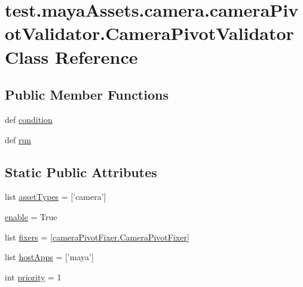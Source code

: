 \hypertarget{classtest_1_1mayaAssets_1_1camera_1_1cameraPivotValidator_1_1CameraPivotValidator}{\section{test.\-maya\-Assets.\-camera.\-camera\-Pivot\-Validator.\-Camera\-Pivot\-Validator \-Class \-Reference}
\label{d7/d71/classtest_1_1mayaAssets_1_1camera_1_1cameraPivotValidator_1_1CameraPivotValidator}
}
\subsection*{\-Public \-Member \-Functions}
\begin{DoxyCompactItemize}
\item 
def \hyperlink{classtest_1_1mayaAssets_1_1camera_1_1cameraPivotValidator_1_1CameraPivotValidator_a976f03c3834da1ca30215212a06a969a}{condition}
\item 
def \hyperlink{classtest_1_1mayaAssets_1_1camera_1_1cameraPivotValidator_1_1CameraPivotValidator_ab7a54b126d4a4a91c533b9d4199dd4e9}{run}
\end{DoxyCompactItemize}
\subsection*{\-Static \-Public \-Attributes}
\begin{DoxyCompactItemize}
\item 
list \hyperlink{classtest_1_1mayaAssets_1_1camera_1_1cameraPivotValidator_1_1CameraPivotValidator_abbea9f5217bd6142503740bab1ddb602}{asset\-Types} = \mbox{[}'camera'\mbox{]}
\item 
\hyperlink{classtest_1_1mayaAssets_1_1camera_1_1cameraPivotValidator_1_1CameraPivotValidator_a734bcfe5e553371e0405894470a15615}{enable} = \-True
\item 
list \hyperlink{classtest_1_1mayaAssets_1_1camera_1_1cameraPivotValidator_1_1CameraPivotValidator_a2202f4bd78b40fad593bef9ab216186b}{fixers} = \mbox{[}\hyperlink{classtest_1_1mayaAssets_1_1camera_1_1cameraPivotFixer_1_1CameraPivotFixer}{camera\-Pivot\-Fixer.\-Camera\-Pivot\-Fixer}\mbox{]}
\item 
list \hyperlink{classtest_1_1mayaAssets_1_1camera_1_1cameraPivotValidator_1_1CameraPivotValidator_a997e5403a6f0f5eaf4975f225eba0306}{host\-Apps} = \mbox{[}'maya'\mbox{]}
\item 
int \hyperlink{classtest_1_1mayaAssets_1_1camera_1_1cameraPivotValidator_1_1CameraPivotValidator_a0ee5ca5039b1246c567289e440a4d22b}{priority} = 1
\end{DoxyCompactItemize}


